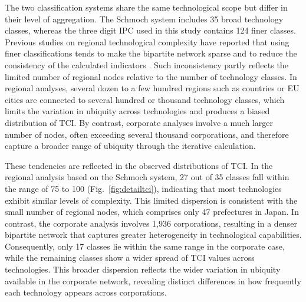 \documentclass[lineno,pdflatex,sn-mathphys-num]{sn-jnl}%
\theoremstyle{thmstyleone}%
\theoremstyle{thmstyletwo}%
\theoremstyle{thmstylethree}%
\begin{document}
The two classification systems share the same technological scope but differ in their level of aggregation.
The Schmoch system includes 35 broad technology classes, whereas the three digit IPC used in this study contains 124 finer classes.
Previous studies on regional technological complexity have reported that using finer classifications tends to make the bipartite network sparse and to reduce the consistency of the calculated indicators \cite{morrison2017economic,Tacchella2012}.
Such inconsistency partly reflects the limited number of regional nodes relative to the number of technology classes.
In regional analyses, several dozen to a few hundred regions such as countries or EU cities \cite{Hidalgo2021,nepelski2020technological} are connected to several hundred or thousand technology classes, which limits the variation in ubiquity across technologies and produces a biased distribution of TCI.
By contrast, corporate analyses involve a much larger number of nodes, often exceeding several thousand corporations, and therefore capture a broader range of ubiquity through the iterative calculation.

These tendencies are reflected in the observed distributions of TCI.
In the regional analysis based on the Schmoch system, 27 out of 35 classes fall within the range of 75 to 100 (Fig.~\ref{fig:detailtci}), indicating that most technologies exhibit similar levels of complexity.
This limited dispersion is consistent with the small number of regional nodes, which comprises only 47 prefectures in Japan.
In contrast, the corporate analysis involves 1,936 corporations, resulting in a denser bipartite network that captures greater heterogeneity in technological capabilities.
Consequently, only 17 classes lie within the same range in the corporate case, while the remaining classes show a wider spread of TCI values across technologies.
This broader dispersion reflects the wider variation in ubiquity available in the corporate network, revealing distinct differences in how frequently each technology appears across corporations.
\end{document}
